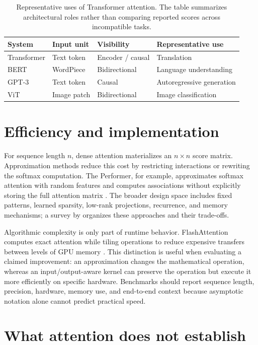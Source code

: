 \documentclass{article}
\begin{document}
\begin{table}[t]
  \centering
  \caption{Representative uses of Transformer attention. The table summarizes architectural roles rather than comparing reported scores across incompatible tasks.}
  \label{tab:applications}
  \begin{tabular}{@{}llll@{}}
    \toprule
    System & Input unit & Visibility & Representative use \\
    \midrule
    Transformer & Text token & Encoder / causal & Translation \\
    BERT & WordPiece & Bidirectional & Language understanding \\
    GPT-3 & Text token & Causal & Autoregressive generation \\
    ViT & Image patch & Bidirectional & Image classification \\
    \bottomrule
  \end{tabular}
\end{table}

\section{Efficiency and implementation}

For sequence length $n$, dense attention materializes an $n\times n$ score matrix.
Approximation methods reduce this cost by restricting interactions or rewriting the softmax computation.
The Performer, for example, approximates softmax attention with random features and computes associations without explicitly storing the full attention matrix \citep{choromanski2021rethinking}.
The broader design space includes fixed patterns, learned sparsity, low-rank projections, recurrence, and memory mechanisms; a survey by \citet{tay2022efficient} organizes these approaches and their trade-offs.

Algorithmic complexity is only part of runtime behavior.
FlashAttention computes exact attention while tiling operations to reduce expensive transfers between levels of GPU memory \citep{dao2022flashattention}.
This distinction is useful when evaluating a claimed improvement: an approximation changes the mathematical operation, whereas an input/output-aware kernel can preserve the operation but execute it more efficiently on specific hardware.
Benchmarks should report sequence length, precision, hardware, memory use, and end-to-end context because asymptotic notation alone cannot predict practical speed.

\section{What attention does not establish}
\end{document}
